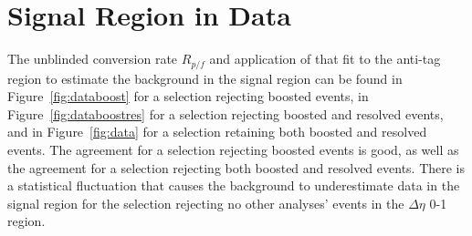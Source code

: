 \section{Signal Region in Data\label{ss:BkgInSigRegion}}

 

The unblinded conversion rate $R_{p/f}$ and application of that fit to the anti-tag region to estimate the background in the signal region can be found in Figure~\ref{fig:databoost} for a selection rejecting boosted events, in Figure~\ref{fig:databoostres} for a selection rejecting boosted and resolved events, and in Figure~\ref{fig:data} for a selection retaining both boosted and resolved events. The agreement for a selection rejecting boosted events is good, as well as the agreement for a selection rejecting both boosted and resolved events. There is a statistical fluctuation that causes the background to underestimate data in the signal region for the selection rejecting no other analyses' events in the $\Delta\eta$ 0-1 region. 

